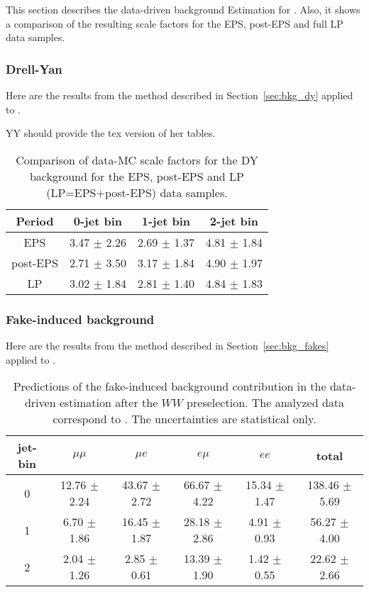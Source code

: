 This section describes the data-driven background Estimation for \lpintlumi. 
Also, it shows a comparison of the resulting scale factors for the EPS, post-EPS and full LP data samples.

\subsubsection{Drell-Yan}

Here are the results from the method described in Section~\ref{sec:bkg_dy} applied to \lpintlumi.

YY should provide the tex version of her tables.

\begin{table}[!htbp]
\begin{center}
\begin{tabular}{c c c c} 
\hline
Period & 0-jet bin & 1-jet bin & 2-jet bin \\ 
\hline
EPS      & 3.47 $\pm$ 2.26 & 2.69 $\pm$ 1.37 & 4.81 $\pm$ 1.84 \\
post-EPS & 2.71 $\pm$ 3.50 & 3.17 $\pm$ 1.84 & 4.90 $\pm$ 1.97 \\
LP       & 3.02 $\pm$ 1.84 & 2.81 $\pm$ 1.40 & 4.84 $\pm$ 1.83 \\
\hline
\end{tabular}
\caption{Comparison of data-MC scale factors for the DY background for the EPS, post-EPS and LP (LP=EPS+post-EPS) data samples.}
\label{tab:lp_periods_dy}
\end{center}
\end{table}


\subsubsection{Fake-induced background}

Here are the results from the method described in Section~\ref{sec:bkg_fakes} applied to \lpintlumi.

\begin{table}[!htbp]
\begin{center}
\begin{tabular}{c c c c c c} 
\hline
jet-bin &	 $\mu\mu$ &	 $\mu e$ &	 $e\mu$ &	 $ee$ &	 total \\ 
\hline
0 &	 12.76 $\pm$ 2.24 &	 43.67 $\pm$ 2.72 &	 66.67 $\pm$ 4.22 &	 15.34 $\pm$ 1.47 &	 138.46 $\pm$ 5.69 \\
1 &	 6.70 $\pm$ 1.86  &      16.45 $\pm$ 1.87 &      28.18 $\pm$ 2.86 &       4.91 $\pm$ 0.93 &       56.27 $\pm$ 4.00 \\
2 &	 2.04 $\pm$ 1.26  &       2.85 $\pm$ 0.61 &      13.39 $\pm$ 1.90 &       1.42 $\pm$ 0.55 &       22.62 $\pm$ 2.66 \\
\hline
\end{tabular}
\caption{Predictions of the fake-induced background contribution 
in the data-driven estimation after the $WW$ preselection. 
The analyzed data correspond to \lpintlumi.
The uncertainties are statistical only.}
\label{tab:lp_fake_est}
\end{center}
\end{table}

